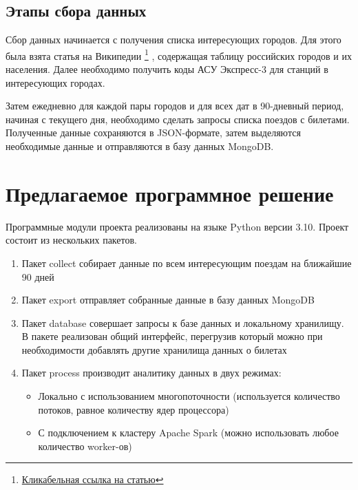 \documentclass[conference]{IEEEtran}
\begin{document}
\subsection{Этапы сбора данных}

Сбор данных начинается с получения списка интересующих городов. Для этого была взята статья на Википедии \footnote{\href{https://ru.wikipedia.org/wiki/\%D0\%A1\%D0\%BF\%D0\%B8\%D1\%81\%D0\%BE\%D0\%BA\_\%D0\%B3\%D0\%BE\%D1\%80\%D0\%BE\%D0\%B4\%D0\%BE\%D0\%B2\_\%D0\%A0\%D0\%BE\%D1\%81\%D1\%81\%D0\%B8\%D0\%B8\_\%D1\%81\_\%D0\%BD\%D0\%B0\%D1\%81\%D0\%B5\%D0\%BB\%D0\%B5\%D0\%BD\%D0\%B8\%D0\%B5\%D0\%BC\_\%D0\%B1\%D0\%BE\%D0\%BB\%D0\%B5\%D0\%B5\_100\_\%D1\%82\%D1\%8B\%D1\%81\%D1\%8F\%D1\%87\_\%D0\%B6\%D0\%B8\%D1\%82\%D0\%B5\%D0\%BB\%D0\%B5\%D0\%B9}{Кликабельная ссылка на статью}}
, содержащая таблицу российских городов и их населения. Далее необходимо получить коды АСУ Экспресс-3 для станций в интересующих городах.

Затем ежедневно для каждой пары городов и для всех дат в 90-дневный период, начиная с текущего дня, необходимо сделать запросы списка поездов с билетами. Полученные данные сохраняются в JSON-формате, затем выделяются необходимые данные и отправляются в базу данных MongoDB.

\section{Предлагаемое программное решение}

Программные модули проекта реализованы на языке Python версии 3.10. Проект состоит из нескольких пакетов.

\begin{enumerate}
	\item Пакет collect собирает данные по всем интересующим поездам на ближайшие 90 дней
	
	\item Пакет export отправляет собранные данные в базу данных MongoDB
	
	\item Пакет database совершает запросы к базе данных и локальному хранилищу. В пакете реализован общий интерфейс, перегрузив который можно при необходимости добавлять другие хранилища данных о билетах
	
	\item Пакет process производит аналитику данных в двух режимах:
	
	\begin{itemize}
		\item Локально с использованием многопоточности (используется количество потоков, равное количеству ядер процессора)
		
		\item С подключением к кластеру Apache Spark (можно использовать любое количество worker-ов)
	\end{itemize}
\end{enumerate}
\end{document}
